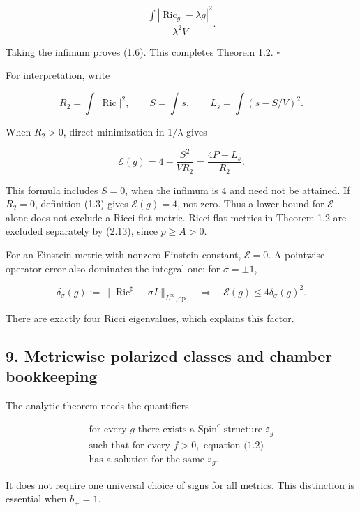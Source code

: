 \documentclass[
  11pt,
]{article}
\begin{document}
\[
 \frac{\int|\operatorname{Ric}_g-\lambda g|^2}{\lambda^2V}.
\]

Taking the infimum proves (1.6). This completes Theorem 1.2. \(\square\)

For interpretation, write

\[
 R_2=\int|\operatorname{Ric}|^2,\qquad S=\int s,\qquad
 L_s=\int(s-S/V)^2.
\]

When \(R_2>0\), direct minimization in \(1/\lambda\) gives

\[
              \mathcal E(g)=4-\frac{S^2}{VR_2}
                             =\frac{4P+L_s}{R_2}.        \tag{8.1}
\]

This formula includes \(S=0\), when the infimum is \(4\) and need not be
attained. If \(R_2=0\), definition (1.3) gives \(\mathcal E(g)=4\), not
zero. Thus a lower bound for \(\mathcal E\) alone does not exclude a
Ricci-flat metric. Ricci-flat metrics in Theorem 1.2 are excluded
separately by (2.13), since \(p\ge A>0\).

For an Einstein metric with nonzero Einstein constant, \(\mathcal E=0\).
A pointwise operator error also dominates the integral one: for
\(\sigma=\pm1\),

\[
 \delta_\sigma(g):=\|\operatorname{Ric}^{\sharp}-\sigma I\|_{L^\infty,\mathrm{op}}
      \quad\Longrightarrow\quad\mathcal E(g)\le4\delta_\sigma(g)^2.
 \tag{8.2}
\]

There are exactly four Ricci eigenvalues, which explains this factor.

\hypertarget{metricwise-polarized-classes-and-chamber-bookkeeping}{%
\subsection{9. Metricwise polarized classes and chamber
bookkeeping}\label{metricwise-polarized-classes-and-chamber-bookkeeping}}

The analytic theorem needs the quantifiers

\[
 \boxed{\begin{gathered}
   \text{for every }g\text{ there exists a Spin}^c
       \text{ structure }\mathfrak s_g\\
   \text{such that for every }f>0,\text{ equation (1.2)}\\
   \text{has a solution for the same }\mathfrak s_g.
 \end{gathered}}
 \tag{9.1}
\]

It does not require one universal choice of signs for all metrics. This
distinction is essential when \(b_+=1\).
\end{document}
